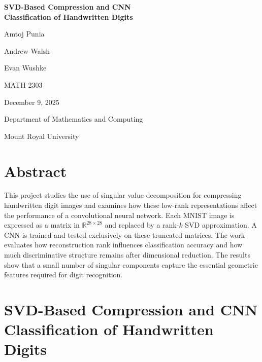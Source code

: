 \documentclass[11pt]{article}
\begin{document}
    \begin{titlepage}
        \centering
        \vspace*{1cm} %
    
        {\Large\bfseries SVD-Based Compression and CNN \\ Classification of Handwritten Digits\par}
        \vspace{1.5cm} %
        {\large Amtoj Punia \par Andrew Walsh \par Evan Wushke \par}
        \vspace{1cm} %
        {\large MATH 2303\par}
        \vspace{0.5cm} %
        {\large December 9, 2025\par}
    
        \vfill
    
        \vfill %
        {\large Department of Mathematics and Computing\par}
        {\large Mount Royal University\par}
    \end{titlepage}


\section*{Abstract}
This project studies the use of singular value decomposition for compressing handwritten digit images and examines how these low-rank representations affect the performance of a convolutional neural network. Each MNIST image is expressed as a matrix in \(\mathbb{R}^{28 \times 28}\) and replaced by a rank-\(k\) SVD approximation. A CNN is trained and tested exclusively on these truncated matrices. The work evaluates how reconstruction rank influences classification accuracy and how much discriminative structure remains after dimensional reduction. The results show that a small number of singular components capture the essential geometric features required for digit recognition.

\section*{SVD-Based Compression and CNN Classification of Handwritten Digits}
\end{document}
